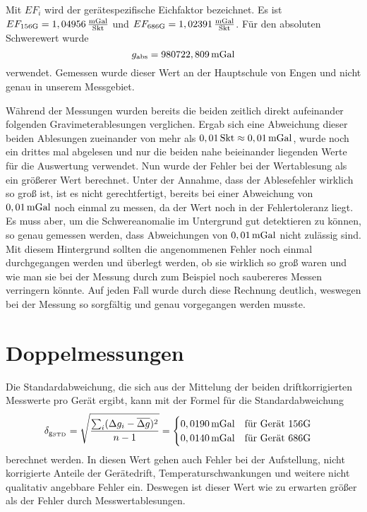 Mit $EF_i$ wird der gerätespezifische Eichfaktor bezeichnet. Es ist $EF_{\mathrm{156G}}=1,04956\,\frac{\mathrm{mGal}}{\mathrm{Skt}}$ und $EF_{\mathrm{686G}}=1,02391\,\frac{\mathrm{mGal}}{\mathrm{Skt}}$. Für den absoluten Schwerewert wurde
\begin{equation}
 g_{\mathrm{abs}}=980722,809\,\mathrm{mGal}
\end{equation}
verwendet. Gemessen wurde dieser Wert an der Hauptschule von Engen und nicht genau in unserem Messgebiet.

Während der Messungen wurden bereits die beiden zeitlich direkt aufeinander folgenden Gravimeterablesungen verglichen. Ergab sich eine Abweichung dieser beiden Ablesungen zueinander von mehr als $0,01\,\mathrm{Skt}\approx0,01\,\mathrm{mGal}$, wurde noch ein drittes mal abgelesen und nur die beiden nahe beieinander liegenden Werte für die Auswertung verwendet. Nun wurde der Fehler bei der Wertablesung als ein größerer Wert berechnet. Unter der Annahme, dass der Ablesefehler wirklich so groß ist, ist es nicht gerechtfertigt, bereits bei einer Abweichung von $0,01\,\mathrm{mGal}$ noch einmal zu messen, da der Wert noch in der Fehlertoleranz liegt. Es muss aber, um die Schwereanomalie im Untergrund gut detektieren zu können, so genau gemessen werden, dass Abweichungen von $0,01\,\mathrm{mGal}$ nicht zulässig sind. Mit diesem Hintergrund sollten die angenommenen Fehler noch einmal durchgegangen werden und überlegt werden, ob sie wirklich so groß waren und wie man sie bei der Messung durch zum Beispiel noch saubereres Messen verringern könnte. Auf jeden Fall wurde durch diese Rechnung deutlich, weswegen bei der Messung so sorgfältig und genau vorgegangen werden musste.

\section{Doppelmessungen}
\label{sec:Fehler}

Die Standardabweichung, die sich aus der Mittelung der beiden driftkorrigierten Messwerte pro Gerät ergibt, kann mit der Formel für die Standardabweichung
\begin{equation}
 \delta_{\mathrm{g_{\mathrm{STD}}}}=\sqrt{\frac{\sum_i (\Delta g_i - \overline{\Delta g})^2}{n-1}}
 =\begin{cases}
   0,0190\,\mathrm{mGal} \quad \text{für Gerät 156G}\\
     0,0140\,\mathrm{mGal} \quad \text{für Gerät 686G}
  \end{cases}
  \label{eq:Fehler}
\end{equation}
berechnet werden. In diesen Wert gehen auch Fehler bei der Aufstellung, nicht korrigierte Anteile der Gerätedrift, Temperaturschwankungen und weitere nicht qualitativ angebbare Fehler ein. Deswegen ist dieser Wert wie zu erwarten größer als der Fehler durch Messwertablesungen.

